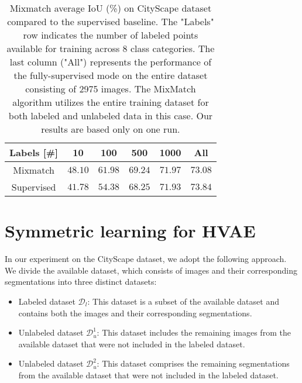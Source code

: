 \begin{table}[tbh]
    \begin{tabular}{|c|c|c|c|c|c|}
    \hline
    Labels [\#]  & 10 & 100 & 500 & 1000 & All \\
    \hline
    Mixmatch & $48.10$ & $61.98$ & $69.24$ & $71.97$ & $73.08$ \\
    \hline
    Supervised & $41.78$ & $54.38$ & $68.25$ & $71.93$ & $73.84$ \\
    \hline
    \end{tabular}
    \caption[Mixmatch average IoU on CityScape]{Mixmatch average IoU (\%) on CityScape dataset compared to the supervised baseline. The 
    "Labels" row indicates the number of labeled points available for training across 8 class categories. The last 
    column ("All") represents the performance of the fully-supervised mode on the entire dataset consisting of 2975 images. 
    The MixMatch algorithm utilizes the entire training dataset for both labeled and unlabeled data in this case.
    Our results are based only on one run.}
    \label{tab:mixmatch-cityscapes-iou}
\end{table}
     

\section{Symmetric learning for HVAE}
In our experiment on the CityScape dataset, we adopt the following approach. We 
divide the available dataset, which consists of images and their corresponding
segmentations into three distinct datasets:
\begin{itemize}
    \item  Labeled dataset $\mathcal{D}_l$: This dataset is a subset of the available dataset and contains both the 
    images and their corresponding segmentations.
    \item  Unlabeled dataset $\mathcal{D}^1_u$: This dataset includes the remaining images from the available dataset 
    that were not included in the labeled dataset.
    \item  Unlabeled dataset $\mathcal{D}^2_u$: This dataset comprises the remaining segmentations from the available 
    dataset that were not included in the labeled dataset.
\end{itemize}
    
